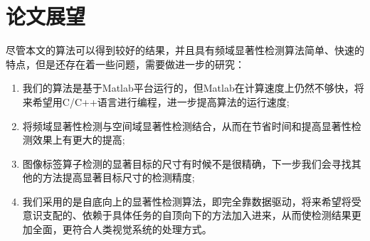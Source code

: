 \section{论文展望}
\label{5_2}

尽管本文的算法可以得到较好的结果，并且具有频域显著性检测算法简单、快速的特点，但是还存在着一些问题，需要做进一步的研究：
\begin{enumerate}
\item 我们的算法是基于Matlab平台运行的，但Matlab在计算速度上仍然不够快，将来希望用C/C++语言进行编程，进一步提高算法的运行速度;
\item 将频域显著性检测与空间域显著性检测结合，从而在节省时间和提高显著性检测效果上有更大的提高;
\item 图像标签算子检测的显著目标的尺寸有时候不是很精确，下一步我们会寻找其他的方法提高显著目标尺寸的检测精度;
\item 我们采用的是自底向上的显著性检测算法，即完全靠数据驱动，将来希望将受意识支配的、依赖于具体任务的自顶向下的方法加入进来，从而使检测结果更加全面，更符合人类视觉系统的处理方式。
\end{enumerate}












































